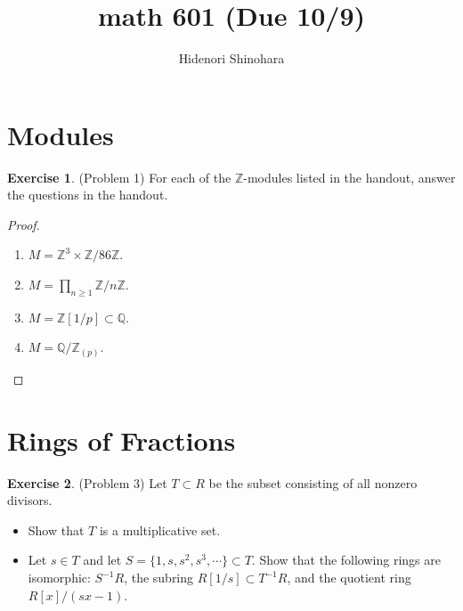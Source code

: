 \documentclass[12pt, psamsfonts]{amsart}
\theoremstyle{definition}
\newtheorem*{exer}{Exercise}
\theoremstyle{remark}
\numberwithin{equation}{section}
\begin{document}
\title{math 601 (Due 10/9)}
\author{Hidenori Shinohara}
\maketitle
\tableofcontents

\section{Modules}

\begin{exer}{(Problem 1)}
  For each of the $\mathbb{Z}$-modules listed in the handout, answer the questions in the handout.
\end{exer}

\begin{proof}
$ $
  \begin{enumerate}[label=(\alph*)]
    \item 
      $M = \mathbb{Z}^3 \times \mathbb{Z} / 86\mathbb{Z}$.
    \item 
      $M = \prod_{n \geq 1} \mathbb{Z} / n\mathbb{Z}$.
    \item 
      $M = \mathbb{Z}[1/p] \subset \mathbb{Q}$.
    \item 
      $M = \mathbb{Q} / \mathbb{Z}_{(p)}$.
  \end{enumerate}
\end{proof}

\section{Rings of Fractions}

\begin{exer}{(Problem 3)}
  Let $T \subset R$ be the subset consisting of all nonzero divisors.
  \begin{itemize}
    \item
      Show that $T$ is a multiplicative set.
    \item
      Let $s \in T$ and let $S = \{ 1, s, s^2, s^3, \cdots \} \subset T$.
      Show that the following rings are isomorphic: $S^{-1}R$, the subring $R[1/s] \subset T^{-1}R$, and the quotient ring $R[x]/(sx - 1)$.
  \end{itemize}
\end{exer}
\end{document}
